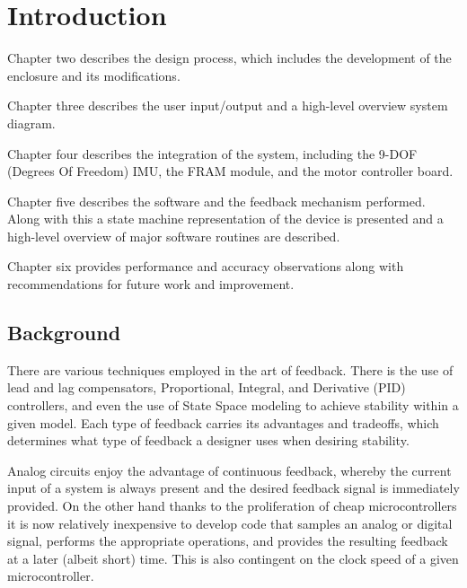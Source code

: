 \chapter{Introduction}

Chapter two describes the design process, which includes the development of the enclosure and its modifications.

Chapter three describes the user input/output and a high-level overview system diagram.

Chapter four describes the integration of the system, including the 9-DOF (Degrees Of Freedom) IMU, the FRAM module, and the motor controller board.

Chapter five describes the software and the feedback mechanism performed.  Along with this a state machine representation of the device is presented and a high-level overview of major software routines are described.

Chapter six provides performance and accuracy observations along with recommendations for future work and improvement.

\section{Background}

 There are various techniques employed in the art of feedback.  There is the use of lead and lag compensators, Proportional, Integral, and Derivative (PID) controllers, and even the use of State Space modeling to achieve stability within a given model.  Each type of feedback carries its advantages and tradeoffs, which determines what type of feedback a designer uses when desiring stability.

 Analog circuits enjoy the advantage of continuous feedback, whereby the current input of a system is always present and the desired feedback signal is immediately provided.  On the other hand thanks to the proliferation of cheap microcontrollers it is now relatively inexpensive to develop code that samples an analog or digital signal, performs the appropriate operations, and provides the resulting feedback at a later (albeit short) time.  This is also contingent on the clock speed of a given microcontroller.

